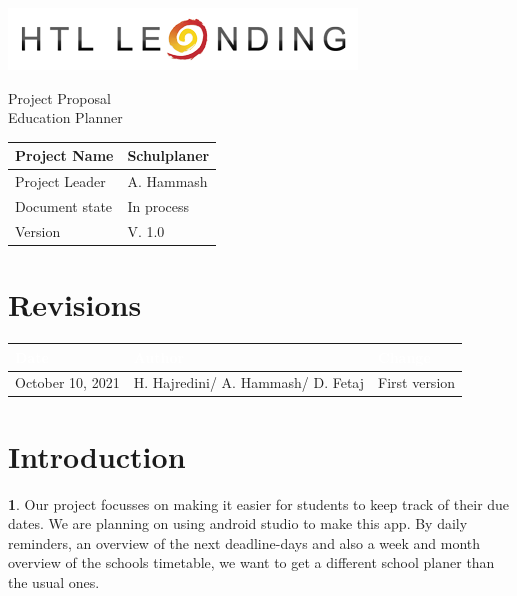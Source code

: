 \documentclass[12pt]{article}
\theoremstyle{definition}
\newtheorem{ourVersion}{ \linebreak}
\newcommand{\projectname}{Schulplaner}
\newcommand{\productname}{Education Planner}
\newcommand{\projectleader}{A. Hammash}
\newcommand{\documentstatus}{In process}
\newcommand{\version}{V. 1.0}
\begin{document}
\begin{titlepage}
\begin{flushright}
\includegraphics[scale=.5]{htlleondinglogo.png}\\
\end{flushright}

\vspace{10em}

\begin{center}
{\Huge Project Proposal} \\[3em]
{\LARGE \productname} \\[3em]
\end{center}

\begin{flushleft}
\begin{tabular}{|l|l|}
\hline
Project Name & \projectname \\ \hline
Project Leader & \projectleader \\ \hline
Document state & \documentstatus \\ \hline
Version & \version \\ \hline
\end{tabular}
\end{flushleft}

\end{titlepage}
\section*{Revisions}
\begin{tabular}{|l|l|l|}
\hline
\cellcolor[gray]{0.5}\textcolor{white}{Date} & \cellcolor[gray]{0.5}\textcolor{white}{Author} & \cellcolor[gray]{0.5}\textcolor{white}{Change} \\ \hline
October 10, 2021&H. Hajredini/ A. Hammash/ D. Fetaj&First version \\ \hline
\end{tabular}
\pagebreak

\tableofcontents
\pagebreak

\section{Introduction}

\begin{ourVersion}
Our project focusses on making it easier for students to keep track of their due dates. 
We are planning on using android studio to make this app. 
By daily reminders, an overview of the next deadline-days and also a week and month overview of the schools timetable, 
we want to get a different school planer than the usual ones. 
\end{ourVersion}
\pagebreak
\end{document}
